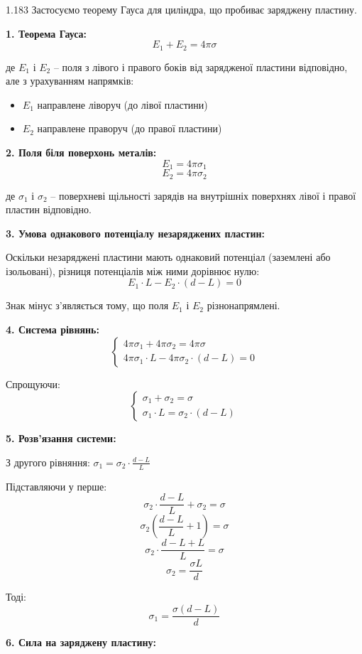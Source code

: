 \begin{Solution}{1.{183}}
Застосуємо теорему Гауса для циліндра, що пробиває заряджену пластину.

\textbf{1. Теорема Гауса:}
$$E_1 + E_2 = 4\pi\sigma$$

де $E_1$ і $E_2$ -- поля з лівого і правого боків від зарядженої пластини відповідно, але з урахуванням напрямків:
\begin{itemize}
    \item $E_1$ направлене ліворуч (до лівої пластини)
    \item $E_2$ направлене праворуч (до правої пластини)
\end{itemize}

\textbf{2. Поля біля поверхонь металів:}
$$E_1 = 4\pi\sigma_1$$
$$E_2 = 4\pi\sigma_2$$

де $\sigma_1$ і $\sigma_2$ -- поверхневі щільності зарядів на внутрішніх поверхнях лівої і правої пластин відповідно.

\textbf{3. Умова однакового потенціалу незаряджених пластин:}

Оскільки незаряджені пластини мають однаковий потенціал (заземлені або ізольовані), різниця потенціалів між ними дорівнює нулю:
$$E_1 \cdot L - E_2 \cdot (d-L) = 0$$

Знак мінус з'являється тому, що поля $E_1$ і $E_2$ різнонапрямлені.

\textbf{4. Система рівнянь:}
$$\begin{cases}
4\pi\sigma_1 + 4\pi\sigma_2 = 4\pi\sigma \\
4\pi\sigma_1 \cdot L - 4\pi\sigma_2 \cdot (d-L) = 0
\end{cases}$$

Спрощуючи:
$$\begin{cases}
\sigma_1 + \sigma_2 = \sigma \\
\sigma_1 \cdot L = \sigma_2 \cdot (d-L)
\end{cases}$$

\textbf{5. Розв'язання системи:}

З другого рівняння: $\sigma_1 = \sigma_2 \cdot \frac{d-L}{L}$

Підставляючи у перше:
$$\sigma_2 \cdot \frac{d-L}{L} + \sigma_2 = \sigma$$
$$\sigma_2 \left(\frac{d-L}{L} + 1\right) = \sigma$$
$$\sigma_2 \cdot \frac{d-L+L}{L} = \sigma$$
$$\sigma_2 = \frac{\sigma L}{d}$$

Тоді:
$$\sigma_1 = \frac{\sigma(d-L)}{d}$$

\textbf{6. Сила на заряджену пластину:}


\end{Solution}
